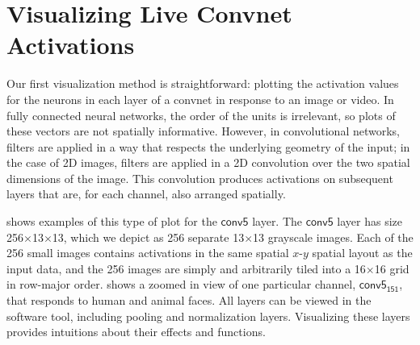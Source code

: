 \documentclass{article}
\newcommand{\layer}[1]{\ensuremath{\mathsf{#1}\xspace}}
\newcommand{\unit}[2]{\ensuremath{\mathsf{#1_{#2}}\xspace}}
\begin{document}
\section{Visualizing Live Convnet Activations}

Our first visualization method is straightforward:  plotting the activation values for the neurons in each layer of a convnet in response to an image or video. In fully connected neural networks, the order of the units is irrelevant, so plots of these vectors are not spatially informative. However, in convolutional networks, filters are applied in a way that respects the underlying geometry of the input; in the case of 2D images, filters are applied in a 2D convolution over the two spatial dimensions of the image. This convolution produces activations on subsequent layers that are, for each channel, also arranged spatially.

 shows examples of this type of plot for the \layer{conv5} layer.
The \layer{conv5} layer has size 256$\times$13$\times$13, which we depict as 256 separate 13$\times$13 grayscale images. Each of the 256 small images contains activations in the same spatial $x$-$y$ spatial layout as the input data, and the 256 images are simply and arbitrarily tiled into a 16$\times$16 grid in row-major order.
 shows a zoomed in view of one particular channel, \unit{conv5}{151}, that responds to human and animal faces. All layers can be viewed in the software tool, including pooling and normalization layers. Visualizing these layers provides intuitions about their effects and functions.
\end{document}
